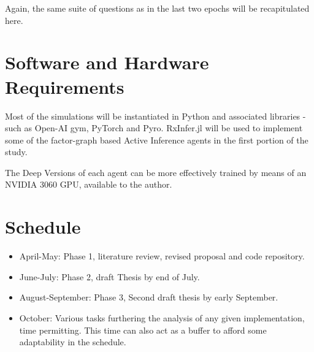 \documentclass[12pt, oneside]{article}
\begin{document}
Again, the same suite of questions as in the last two epochs will be recapitulated here.    

\section{Software and Hardware Requirements}
Most of the simulations will be instantiated in Python and associated libraries  - such as Open-AI gym, PyTorch and Pyro.
RxInfer.jl will be used to implement some of the factor-graph based Active Inference agents in the first portion of the study.

The Deep Versions of each agent can be more effectively trained by means of an NVIDIA 3060 GPU, available to the author.  

\section{Schedule}
\begin{itemize}
\item April-May: Phase 1, literature review, revised proposal and code repository.
\item June-July: Phase 2, draft Thesis by end of July.
\item August-September: Phase 3, Second draft thesis by early September.
\item October: Various tasks furthering the analysis of any given implementation, time permitting. This time can also act as a buffer to afford some adaptability in the schedule.   
\end{itemize}

\printbibliography
\end{document}

